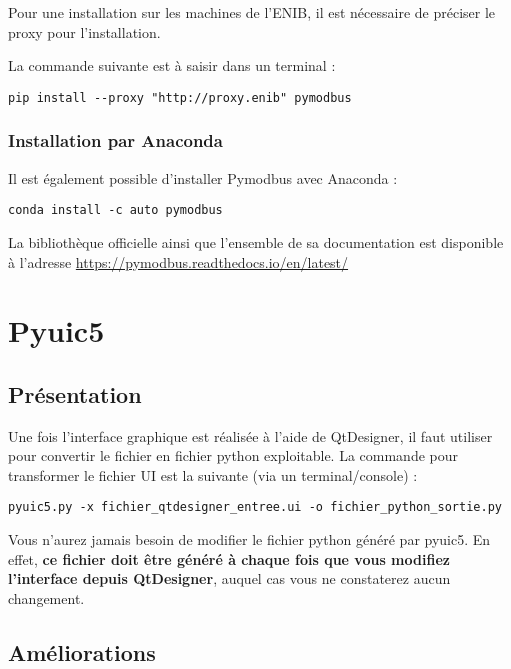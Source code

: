 \documentclass[12pt]{report}    %
\begin{document}
Pour une installation sur les machines de l'ENIB, il est nécessaire de préciser le proxy pour l'installation. \newline 

La commande suivante est à saisir dans un terminal :
\begin{lstlisting}
pip install --proxy "http://proxy.enib" pymodbus
\end{lstlisting}

\subsubsection{Installation par Anaconda}
 Il est également possible d'installer Pymodbus avec Anaconda : 
\begin{lstlisting}
conda install -c auto pymodbus
\end{lstlisting}

La bibliothèque officielle ainsi que l'ensemble de sa documentation est disponible à l'adresse \url{https://pymodbus.readthedocs.io/en/latest/} \newline 

\section{Pyuic5}

\subsection{Présentation}

Une fois l'interface graphique est réalisée à l'aide de QtDesigner, il faut utiliser  pour convertir le fichier  en fichier python exploitable.\newline
La commande pour transformer le fichier UI est la suivante (via un terminal/console) :
\begin{lstlisting}
pyuic5.py -x fichier_qtdesigner_entree.ui -o fichier_python_sortie.py
\end{lstlisting}

Vous n'aurez jamais besoin de modifier le fichier python généré par pyuic5. En effet, \textbf{ce fichier doit être généré à chaque fois que vous modifiez l'interface depuis QtDesigner}, auquel cas vous ne constaterez aucun changement.

\subsection{Améliorations}
\end{document}

